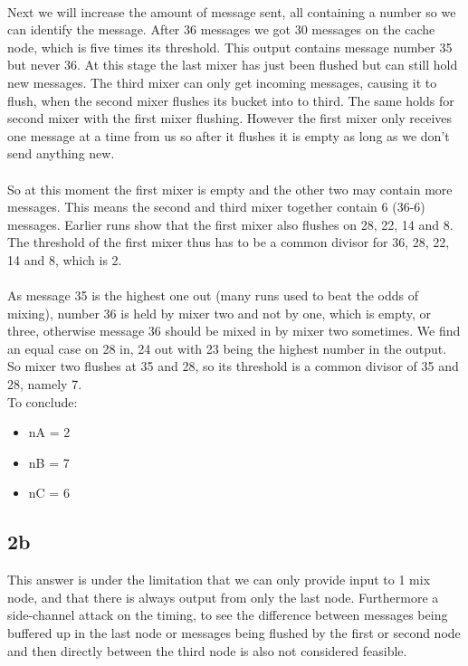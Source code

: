 \documentclass[a4paper,11pt]{article}
\begin{document}
\paragraph{} Next we will increase the amount of message sent, all containing a number so we can identify the message.
After 36 messages we got 30 messages on the cache node, which is five times its threshold.
This output contains message number 35 but never 36.
At this stage the last mixer has just been flushed but can still hold new messages. The third mixer can only get incoming messages, causing it to flush, when the second mixer flushes its bucket into to third.
The same holds for second mixer with the first mixer flushing. However the first mixer only receives one message at a time from us so after it flushes it is empty as long as we don't send anything new. 
\paragraph{}
So at this moment the first mixer is empty and the other two may contain more messages.
This means the second and third mixer together contain 6 (36-6) messages. 
Earlier runs show that the first mixer also flushes on 28, 22, 14 and 8. The threshold of the first mixer thus has to be a common divisor for 36, 28, 22, 14 and 8, which is 2.
\paragraph{}
As message 35 is the highest one out (many runs used to beat the odds of mixing), number 36 is held by mixer two and not by one, which is empty, or three, otherwise message 36 should be mixed in by mixer two sometimes.
We find an equal case on 28 in, 24 out with 23 being the highest number in the output. 
So mixer two flushes at 35 and 28, so its threshold is a common divisor of 35 and 28, namely 7.\\

To conclude:
\begin{itemize}
 \item nA = 2
 \item nB = 7
 \item nC = 6
\end{itemize}

\subsection{2b}
This answer is under the limitation that we can only provide input to 1 mix node, and that there is always output from only the last node. Furthermore a side-channel attack on the timing, to see the difference between messages being buffered up in the last node or messages being flushed by the first or second node and then directly between the third node is also not considered feasible.
\end{document}
